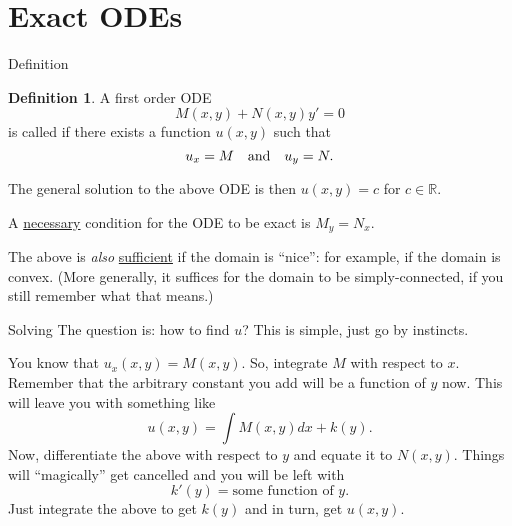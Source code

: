 \documentclass[dvipsnames]{beamer}
\theoremstyle{definition}
\newtheorem{defn}[thm]{Definition}
\begin{document}
\section{Exact ODEs}

\begin{frame}{Definition}
  \begin{defn}
    A first order ODE
    \begin{equation*} 
      M(x, y) + N(x, y) y' = 0
    \end{equation*}
    is called  \pause if there exists a function $u(x, y)$ such that
    \begin{equation*} 
      u_{x} = M \quad\text{and}\quad u_{y} = N.
    \end{equation*}
  \end{defn} \pause
  The general solution to the above ODE is then $u(x, y) = c$ for $c \in \mathbb{R}$. \pause

  A \underline{necessary} condition for the ODE to be exact is $M_{y} = N_{x}$. \pause

  The above is \emph{also} \underline{sufficient} if the domain is ``nice'': for example, if the domain is convex. \pause (More generally, it suffices for the domain to be simply-connected, if you still remember what that means.)
\end{frame}
\begin{frame}{Solving}
  The question is: how to find $u$? \pause This is simple, just go by instincts. \pause

  You know that $u_{x}(x, y) = M(x, y)$. \pause So, integrate $M$ with respect to $x$. \pause Remember that the arbitrary constant you add will be a function of $y$ now. \pause This will leave you with something like 
  \begin{equation*} 
    u(x, y) = \int M(x, y) dx + k(y).
  \end{equation*} \pause
  Now, differentiate the above with respect to $y$ and equate it to $N(x, y)$. \pause Things will ``magically'' get cancelled and you will be left with \pause
  \begin{equation*} 
    k'(y) = \text{some function of $y$}.
  \end{equation*} \pause
  Just integrate the above to get $k(y)$ and in turn, get $u(x, y)$. 
\end{frame}
\end{document}
